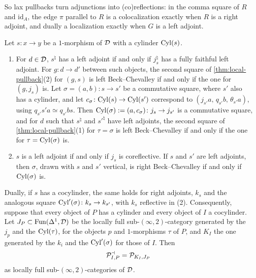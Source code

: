 %
So lax pullbacks turn adjunctions into (co)reflections:
in the comma square of $R$ and $\mathrm{id}_{A}$,
the edge $\pi$ parallel to $R$ is a colocalization exactly when $R$ is a right
adjoint, and dually a localization exactly when $G$ is a left adjoint.

\begin{prop}
\label{prop:cylinder}
%
Let $s\colon x \to y$ be a $1$-morphism of $\mathcal{D}$ with a cylinder $\mathrm{Cyl}(s)$.
\begin{enumerate}
\item For $d \in \mathcal{D}$, $s^{\natural}$ has a left adjoint if and only if
$j_{s}^{\natural}$ has a fully faithful left adjoint.
For $g\colon d \to d'$ between such objects,
the second square of \cref{thm:local-pullback}(2) for $(g,s)$ is left
Beck--Chevalley if and only if the one for $(g,j_{s})$ is.
Let
$\sigma = (a,b)\colon s \to s'$
be a commutative square, where $s'$ also has a cylinder, and let
$c_{\sigma}\colon \mathrm{Cyl}(s) \to \mathrm{Cyl}(s')$
correspond to
$(j_{s'}a,\,q_{s'}b,\,\theta_{s'}a)$,
using
$q_{s'}s'a \simeq q_{s'}bs$.
Then
$\mathrm{Cyl}(\sigma) := (a,c_{\sigma})\colon j_{s} \to j_{s'}$
is a commutative square, and for $d$ such that $s^{\natural}$ and
$s'^{\natural}$ have left adjoints, the second square of
\cref{thm:local-pullback}(1) for $\tau = \sigma$ is left Beck--Chevalley if and
only if the one for $\tau = \mathrm{Cyl}(\sigma)$ is.
\item $s$ is a left adjoint if and only if $j_{s}$ is coreflective.
If $s$ and $s'$ are left adjoints, then $\sigma$,
drawn with $s$ and $s'$ vertical, is right Beck--Chevalley if and only if
$\mathrm{Cyl}(\sigma)$ is.
\end{enumerate}
Dually, if $s$ has a cocylinder, the same holds for right adjoints,
$k_{s}$ and the analogous square
$\mathrm{Cyl}'(\sigma)\colon k_{s} \to k_{s'}$,
with $k_{s}$ reflective in (2).
Consequently, suppose that every object of $P$ has a cylinder and every object
of $I$ a cocylinder. Let
$J_{P} \subset \operatorname{Fun}(\Delta^{1},\mathcal{D})$
be the locally full sub-$(\infty,2)$-category generated by the $j_{p}$ and the
$\mathrm{Cyl}(\tau)$, for the objects $p$ and $1$-morphisms $\tau$ of $P$,
and $K_{I}$ the one generated by the $k_{i}$ and the $\mathrm{Cyl}'(\sigma)$ for those
of $I$. Then
\begin{equation*}
\mathcal{P}^{\dashv}_{I,P} = \mathcal{P}_{K_{I},J_{P}}
\end{equation*}
as locally full sub-$(\infty,2)$-categories of $\mathcal{D}$.
\end{prop}

